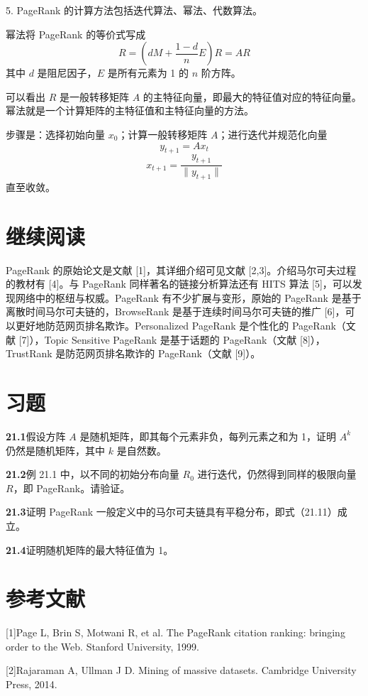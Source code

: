 \documentclass[UTF8, 12pt, fontset=fandol, oneside]{ctexart}
\begin{document}
5. PageRank 的计算方法包括迭代算法、幂法、代数算法。

幂法将 PageRank 的等价式写成
\[
R=\left(dM+\frac{1-d}{n}E\right)R=AR
\]
其中 $d$ 是阻尼因子，$E$ 是所有元素为 1 的 $n$ 阶方阵。

可以看出 $R$ 是一般转移矩阵 $A$ 的主特征向量，即最大的特征值对应的特征向量。幂法就是一个计算矩阵的主特征值和主特征向量的方法。

步骤是：选择初始向量 $x_0$；计算一般转移矩阵 $A$；进行迭代并规范化向量
\[
y_{t+1}=Ax_t
\]
\[
x_{t+1}=\frac{y_{t+1}}{\|y_{t+1}\|}
\]
直至收敛。

\section*{继续阅读}

PageRank 的原始论文是文献 [1]，其详细介绍可见文献 [2,3]。介绍马尔可夫过程的教材有 [4]。与 PageRank 同样著名的链接分析算法还有 HITS 算法 [5]，可以发现网络中的枢纽与权威。PageRank 有不少扩展与变形，原始的 PageRank 是基于离散时间马尔可夫链的，BrowseRank 是基于连续时间马尔可夫链的推广 [6]，可以更好地防范网页排名欺诈。Personalized PageRank 是个性化的 PageRank（文献 [7]），Topic Sensitive PageRank 是基于话题的 PageRank（文献 [8]），TrustRank 是防范网页排名欺诈的 PageRank（文献 [9]）。

\section*{习题}

\noindent\textbf{21.1}\quad 假设方阵 $A$ 是随机矩阵，即其每个元素非负，每列元素之和为 1，证明 $A^k$ 仍然是随机矩阵，其中 $k$ 是自然数。

\noindent\textbf{21.2}\quad 例 21.1 中，以不同的初始分布向量 $R_0$ 进行迭代，仍然得到同样的极限向量 $R$，即 PageRank。请验证。

\noindent\textbf{21.3}\quad 证明 PageRank 一般定义中的马尔可夫链具有平稳分布，即式（21.11）成立。

\noindent\textbf{21.4}\quad 证明随机矩阵的最大特征值为 1。

\section*{参考文献}

[1]\quad Page L, Brin S, Motwani R, et al. The PageRank citation ranking: bringing order to the Web. Stanford University, 1999.

[2]\quad Rajaraman A, Ullman J D. Mining of massive datasets. Cambridge University Press, 2014.
\end{document}
